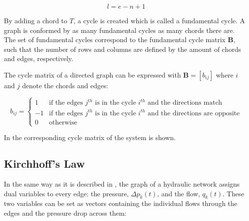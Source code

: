 \begin{equation}
  \label{Numberofchords}
  l = e - n +1
\end{equation}

By adding a chord to $T$, a cycle is created which is called a fundamental cycle. A graph is conformed by as many fundamental cycles as many chords there are\cite{GraphModel}.  
The set of fundamental cycles correspond to the fundamental cycle matrix $\bm{B}$, such that the number of rows and columns are defined by the amount of chords and edges, respectively. 

The cycle matrix of a directed graph can be expressed with $\bm{B} = [b_{ij}]$ where $i$ and $j$ denote the chords and edges:

\begin{equation}
\label{DiGraphCycle}
 b_{ij} =
		\left\{
		\begin{array}{ll}
		
		1 			&      \text{if the edges $j^{th}$ is in the cycle $i^{th}$ and the directions match}	
\\
		-1                       &     \text{if the edges $j^{th}$ is in the cycle $i^{th}$ and the directions are opposite}
\\

                0                       &      \text{otherwise}

		\end{array}
		\right.
\end{equation}	

In  the corresponding cycle matrix of the system is 
shown.

\subsection*{Kirchhoff's Law}
\label{KirchhoffSection}

In the same way as it is described in , the graph of a hydraulic network assigns dual variables to every edge: 
the pressure, $\Delta p_k(t)$, and the flow, $q_k(t)$. These two variables can be set as vectors containing the individual flows through the edges and the pressure drop across them:


